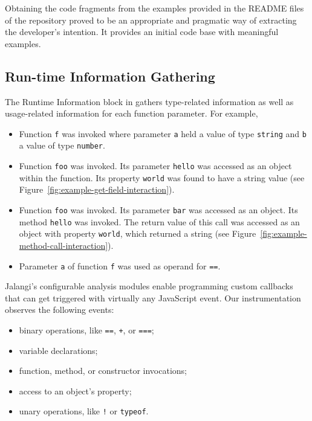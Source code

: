 \documentclass[sigconf]{acmart}
\begin{document}
Obtaining the code fragments from the examples provided in the
README files of the repository proved to be an
appropriate and pragmatic way of extracting the developer's
intention. It provides an initial code base with meaningful
examples.

\subsection{Run-time Information Gathering}
\label{sec:run-time-information}
The Runtime Information block in
 gathers
type-related information as well as usage-related information for each function parameter.
For example,

\begin{itemize}
  \item Function \lstinline{f} was invoked where parameter
    \lstinline{a} held a value of type \lstinline{string} and
    \lstinline{b} a value of type \lstinline{number}. 
  \item Function \lstinline{foo} was invoked. Its parameter
    \lstinline{hello} was accessed as an object within the
    function. Its property \lstinline{world} was found to have a
    string value (see Figure~\ref{fig:example-get-field-interaction}).
  \item Function \lstinline{foo} was invoked. Its parameter
    \lstinline{bar} was accessed as an object. Its method
    \lstinline{hello} was invoked. The return value of this call was
    accessed as an object with property \lstinline{world}, which
    returned a string (see Figure~\ref{fig:example-method-call-interaction}).
  \item Parameter \lstinline{a} of function \lstinline{f} was used as
    operand for \lstinline{==}. 
\end{itemize}

Jalangi's configurable analysis modules enable
programming custom callbacks that can get triggered with virtually any
JavaScript event. Our instrumentation observes the following events: 
\begin{itemize}
  \item binary operations, like \lstinline{==}, \lstinline{+}, or
    \lstinline{===};
  \item variable declarations;
  \item function, method, or constructor invocations;
  \item access to an object's property;
  \item unary operations, like \lstinline{!} or \lstinline{typeof}.
\end{itemize}
\end{document}
